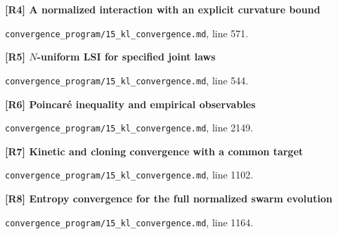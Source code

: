 \documentclass[11pt,a4paper]{article}
\begin{document}
\par\medskip\noindent\begin{minipage}{\linewidth}\textbf{[R4] A normalized interaction with an explicit curvature bound}\label{src:prop-kl-joint-interaction-curvature}\par
{\small\texttt{}\par
\nolinkurl{convergence_program/15_kl_convergence.md}, line 571.\par}
\end{minipage}\par

\par\medskip\noindent\begin{minipage}{\linewidth}\textbf{[R5] \(N\)-uniform LSI for specified joint laws}\label{src:cor-n-uniform-lsi}\par
{\small\texttt{}\par
\nolinkurl{convergence_program/15_kl_convergence.md}, line 544.\par}
\end{minipage}\par

\par\medskip\noindent\begin{minipage}{\linewidth}\textbf{[R6] Poincaré inequality and empirical observables}\label{src:cor-quantitative-lsi-final}\par
{\small\texttt{}\par
\nolinkurl{convergence_program/15_kl_convergence.md}, line 2149.\par}
\end{minipage}\par

\par\medskip\noindent\begin{minipage}{\linewidth}\textbf{[R7] Kinetic and cloning convergence with a common target}\label{src:thm-main-kl-convergence}\par
{\small\texttt{}\par
\nolinkurl{convergence_program/15_kl_convergence.md}, line 1102.\par}
\end{minipage}\par

\par\medskip\noindent\begin{minipage}{\linewidth}\textbf{[R8] Entropy convergence for the full normalized swarm evolution}\label{src:thm-kl-convergence-euclidean}\par
{\small\texttt{}\par
\nolinkurl{convergence_program/15_kl_convergence.md}, line 1164.\par}
\end{minipage}\par
\end{document}
